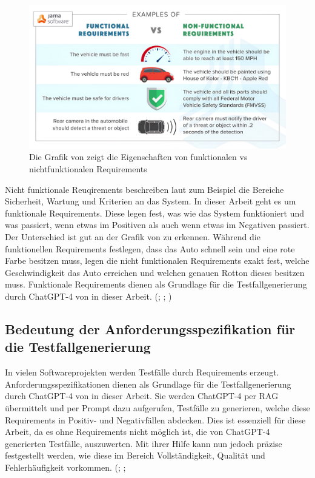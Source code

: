 \documentclass[12pt,toc=bib,toc=listof]{scrreprt}
\begin{document}
\begin{figure}[H]
    \centering
    \includegraphics[width=0.75\linewidth]{./Bilder/Jama Software_Eigenschaften von funktionalen vs nichtfunktionalen Requirements.jpeg}
    \caption{Die Grafik von \textcite{JamaSoftware2024} zeigt die Eigenschaften von funktionalen vs nichtfunktionalen Requirements}
    \label{fig:enter-label}
\end{figure}
\noindent Nicht funktionale Reuqirements beschreiben laut \textcite{Visure2024} zum Beispiel die Bereiche Sicherheit, Wartung und Kriterien an das System. In dieser Arbeit geht es um funktionale Requirements. Diese legen fest, was wie das System funktioniert und was passiert, wenn etwas im Positiven als auch wenn etwas im Negativen passiert. Der Unterschied ist gut an der Grafik von \textcite{JamaSoftware2024} zu erkennen. Während die funktionellen Requirements festlegen, dass das Auto schnell sein und eine rote Farbe besitzen muss, legen die nicht funktionalen Requirements exakt fest, welche Geschwindigkeit das Auto erreichen und welchen genauen Rotton dieses besitzen muss. Funktionale Requirements dienen als Grundlage für die Testfallgenerierung durch ChatGPT-4 von \textcite{OpenAI2025} in dieser Arbeit. (\cite{Aysolmaz2018}; \cite{Barmi2011}; \cite{Mustafa2021})
\newpage

\subsection{Bedeutung der Anforderungsspezifikation für die Testfallgenerierung} %
\label{sec:bedeutungDerAnforderungsspezifikationFürDieTestfallgenerierung}
In vielen Softwareprojekten werden Testfälle durch Requirements erzeugt. Anforderungsspezifikationen dienen als Grundlage für die Testfallgenerierung durch ChatGPT-4 von \textcite{OpenAI2025} in dieser Arbeit. Sie werden ChatGPT-4 per RAG übermittelt und per Prompt dazu aufgerufen, Testfälle zu generieren, welche diese Requirements in Positiv- und Negativfällen abdecken. Dies ist essenziell für diese Arbeit, da es ohne Requirements nicht möglich ist, die von ChatGPT-4 generierten Testfälle, auszuwerten. Mit ihrer Hilfe kann nun jedoch präzise festgestellt werden, wie diese im Bereich Vollständigkeit, Qualität und Fehlerhäufigkeit vorkommen. (\cite{Aysolmaz2018}; \cite{Barmi2011}; \cite{Mustafa2021}\\
\end{document}
